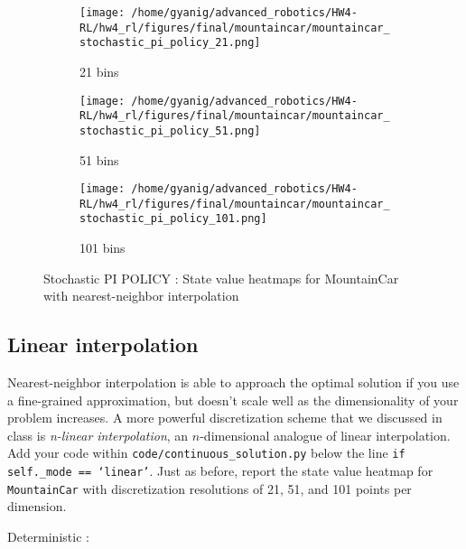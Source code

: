 \documentclass{article}
\begin{document}
\begin{figure}[h]
    \centering
    \begin{subfigure}{0.32\textwidth}
        \texttt{[image: /home/gyanig/advanced\_robotics/HW4-RL/hw4\_rl/figures/final/mountaincar/mountaincar\_stochastic\_pi\_policy\_21.png]}
        \caption{21 bins}
    \end{subfigure}
    \begin{subfigure}{0.32\textwidth}
        \texttt{[image: /home/gyanig/advanced\_robotics/HW4-RL/hw4\_rl/figures/final/mountaincar/mountaincar\_stochastic\_pi\_policy\_51.png]}
        \caption{51 bins}
    \end{subfigure}
    \begin{subfigure}{0.32\textwidth}
        \texttt{[image: /home/gyanig/advanced\_robotics/HW4-RL/hw4\_rl/figures/final/mountaincar/mountaincar\_stochastic\_pi\_policy\_101.png]}
        \caption{101 bins}
    \end{subfigure}
    \caption{Stochastic PI POLICY : State value heatmaps for MountainCar with nearest-neighbor interpolation}
\end{figure}


\newpage
\subsection{Linear interpolation}
Nearest-neighbor interpolation is able to approach the optimal solution if you use a fine-grained approximation, but doesn't scale well as the dimensionality of your problem increases. A more powerful discretization scheme that we discussed in class is \emph{n-linear interpolation}, an $n$-dimensional analogue of linear interpolation. Add your code within \texttt{code/continuous\_solution.py} below the line \texttt{if self.\_mode == `linear'}. Just as before, report the state value heatmap for \texttt{MountainCar} with discretization resolutions of 21, 51, and 101 points per dimension.

Deterministic :
\end{document}
